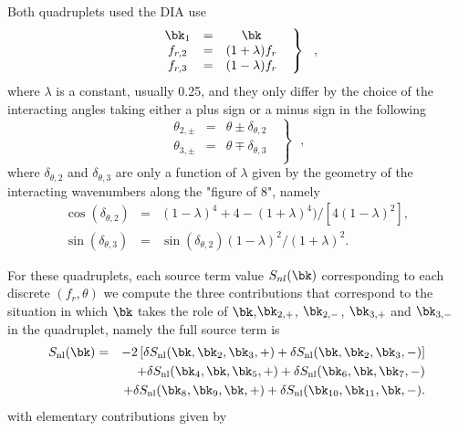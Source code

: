 Both quadruplets used the DIA use 
\begin{equation} \left .
\begin{array}{ccc}
  \bk_1 & = & \bk\\
  f_{r,2}  & = & (1+\lambda)f_{r}    \\
  f_{r,3}  & = & (1-\lambda)f_{r} 
\end{array} \:\:\: \right \rbrace \:\:\: , \label{eq:DIAchoice}
\end{equation}
where $\lambda$ is a constant, usually 0.25, and they only differ by the choice of the interacting angles 
taking either a plus sign or a minus sign in the following 
\begin{equation} \left .
\begin{array}{ccc}
  \theta_{2,\pm}  & = & \theta \pm \delta_{\theta,2}   \\
 \theta_{3,\pm}  & = & \theta \mp  \delta_{\theta,3}   \\
 \end{array} \:\:\: \right \rbrace \:\:\: , \label{eq:DIAangles}
\end{equation}
where $\delta_{\theta,2}$ and $\delta_{\theta,3}$ are only a function of $\lambda$ given by the geometry of
the interacting wavenumbers along the "figure of 8", namely  
\begin{eqnarray}
\cos(\delta_{\theta,2})&=&(1-\lambda)^4+4-(1+\lambda)^4)/[4(1-\lambda)^2], \\
\sin(\delta_{\theta,3})&=&\sin(\delta_{\theta,2}) (1-\lambda)^2/(1+\lambda)^2.
\end{eqnarray}

 For these quadruplets, each source term value
$S_{nl}(\bk)$ corresponding to each discrete $(f_r,\theta)$
we compute the three contributions that correspond to the situation in which $\bk$ takes the role of $\bk$,$\bk_{2,+}$, $\bk_{2,-}$, $\bk_{3,+}$  and $\bk_{3,-}$ in the quadruplet, namely the full source term is 
\begin{eqnarray} 
S_{\mathrm{nl}}(\bk) &=& -2  \left[\delta S_{\mathrm{nl}}(\bk,\bk_2,\bk_3,+)+\delta S_{\mathrm{nl}}(\bk,\bk_2,\bk_3,-)\right] \nonumber  \\
 & & + \delta  S_{\mathrm{nl}}(\bk_4,\bk,\bk_5,+) + \delta  S_{\mathrm{nl}}(\bk_6,\bk,\bk_7,-)  \\
     & &        +   \delta S_{\mathrm{nl}}(\bk_8,\bk_9,\bk, +) + \delta S_{\mathrm{nl}}(\bk_{10},\bk_{11},\bk, -) . \label{eq:diasum}
\end{eqnarray}
with elementary contributions given by


